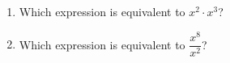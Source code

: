 \documentclass{article}
\begin{document}
\begin{enumerate}




  
  





\item Which expression is equivalent to $x^2\cdot x^3$?

  \begin{enumerate}
  \end{enumerate}  


\item Which expression is equivalent to $\dfrac{x^8}{x^2}$?


\end{enumerate}
\end{document}
